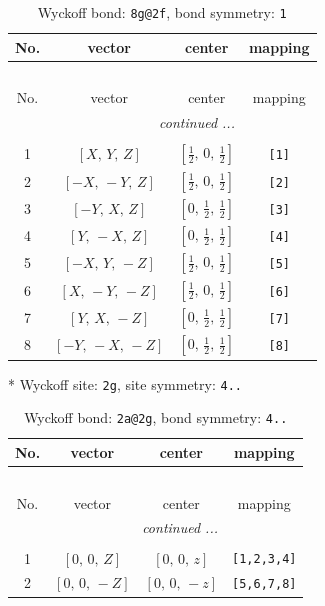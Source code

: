 \documentclass[fleqn,8pt]{jsarticle}
\begin{document}
\begin{longtable}{cccc}
\caption{Wyckoff bond: {\tt 8g@2f}, bond symmetry: {\tt 1}}
 \\
 \hline \hline
No. & vector & center & mapping \\ \hline \endfirsthead

\multicolumn{3}{l}{\tablename\ \thetable{}} \\
 \hline \hline
No. & vector & center & mapping \\ \hline \endhead

 \hline \hline
\multicolumn{3}{r}{\footnotesize\it continued ...} \\ \endfoot

 \hline \hline
\multicolumn{3}{r}{} \\ \endlastfoot

1 & $\left[ X,\, Y,\, Z \right]$ & $\left[ \frac{1}{2},\, 0,\, \frac{1}{2} \right]$ & {\tt [1]} \\ \hline
2 & $\left[ - X,\, - Y,\, Z \right]$ & $\left[ \frac{1}{2},\, 0,\, \frac{1}{2} \right]$ & {\tt [2]} \\ \hline
3 & $\left[ - Y,\, X,\, Z \right]$ & $\left[ 0,\, \frac{1}{2},\, \frac{1}{2} \right]$ & {\tt [3]} \\ \hline
4 & $\left[ Y,\, - X,\, Z \right]$ & $\left[ 0,\, \frac{1}{2},\, \frac{1}{2} \right]$ & {\tt [4]} \\ \hline
5 & $\left[ - X,\, Y,\, - Z \right]$ & $\left[ \frac{1}{2},\, 0,\, \frac{1}{2} \right]$ & {\tt [5]} \\ \hline
6 & $\left[ X,\, - Y,\, - Z \right]$ & $\left[ \frac{1}{2},\, 0,\, \frac{1}{2} \right]$ & {\tt [6]} \\ \hline
7 & $\left[ Y,\, X,\, - Z \right]$ & $\left[ 0,\, \frac{1}{2},\, \frac{1}{2} \right]$ & {\tt [7]} \\ \hline
8 & $\left[ - Y,\, - X,\, - Z \right]$ & $\left[ 0,\, \frac{1}{2},\, \frac{1}{2} \right]$ & {\tt [8]} \\
\end{longtable}
* Wyckoff site: {\tt 2g}, site symmetry: {\tt 4..}
\renewcommand{\arraystretch}{1.2}
\begin{longtable}{cccc}
\caption{Wyckoff bond: {\tt 2a@2g}, bond symmetry: {\tt 4..}}
 \\
 \hline \hline
No. & vector & center & mapping \\ \hline \endfirsthead

\multicolumn{3}{l}{\tablename\ \thetable{}} \\
 \hline \hline
No. & vector & center & mapping \\ \hline \endhead

 \hline \hline
\multicolumn{3}{r}{\footnotesize\it continued ...} \\ \endfoot

 \hline \hline
\multicolumn{3}{r}{} \\ \endlastfoot

1 & $\left[ 0,\, 0,\, Z \right]$ & $\left[ 0,\, 0,\, z \right]$ & {\tt [1,2,3,4]} \\ \hline
2 & $\left[ 0,\, 0,\, - Z \right]$ & $\left[ 0,\, 0,\, - z \right]$ & {\tt [5,6,7,8]} \\
\end{longtable}
\end{document}
